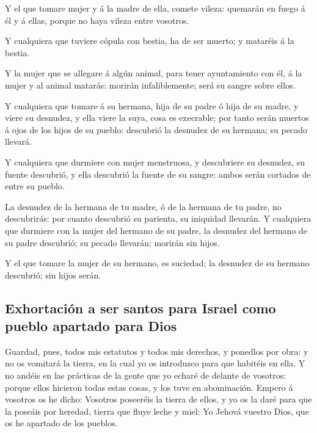 Y el que tomare mujer y á la madre de ella, comete
vileza: quemarán en fuego á él y á ellas, porque no haya vileza entre
vosotros.

 Y cualquiera que tuviere cópula con bestia, ha de ser
muerto; y mataréis á la bestia.

 Y la mujer que se allegare á algún animal, para tener
ayuntamiento con él, á la mujer y al animal matarás: morirán
infaliblemente; será su sangre sobre ellos.

 Y cualquiera que tomare á su hermana, hija de su padre ó
hija de su madre, y viere su desnudez, y ella viere la suya, cosa es
execrable; por tanto serán muertos á ojos de los hijos de su pueblo:
descubrió la desnudez de su hermana; su pecado llevará.

 Y cualquiera que durmiere con mujer menstruosa, y
descubriere su desnudez, su fuente descubrió, y ella descubrió la fuente
de su sangre: ambos serán cortados de entre su pueblo.

 La desnudez de la hermana de tu madre, ó de la hermana
de tu padre, no descubrirás: por cuanto descubrió su parienta, su
iniquidad llevarán.  Y cualquiera que durmiere con la
mujer del hermano de su padre, la desnudez del hermano de su padre
descubrió; su pecado llevarán; morirán sin hijos.

 Y el que tomare la mujer de su hermano, es suciedad; la
desnudez de su hermano descubrió; sin hijos serán.

\hypertarget{exhortaciuxf3n-a-ser-santos-para-israel-como-pueblo-apartado-para-dios}{%
\subsection{Exhortación a ser santos para Israel como pueblo apartado
para
Dios}\label{exhortaciuxf3n-a-ser-santos-para-israel-como-pueblo-apartado-para-dios}}

 Guardad, pues, todos mis estatutos y todos mis derechos,
y ponedlos por obra: y no os vomitará la tierra, en la cual yo os
introduzco para que habitéis en ella.  Y no andéis en las
prácticas de la gente que yo echaré de delante de vosotros: porque ellos
hicieron todas estas cosas, y los tuve en abominación. 
Empero á vosotros os he dicho: Vosotros poseeréis la tierra de ellos, y
yo os la daré para que la poseáis por heredad, tierra que fluye leche y
miel: Yo Jehová vuestro Dios, que os he apartado de los pueblos.

